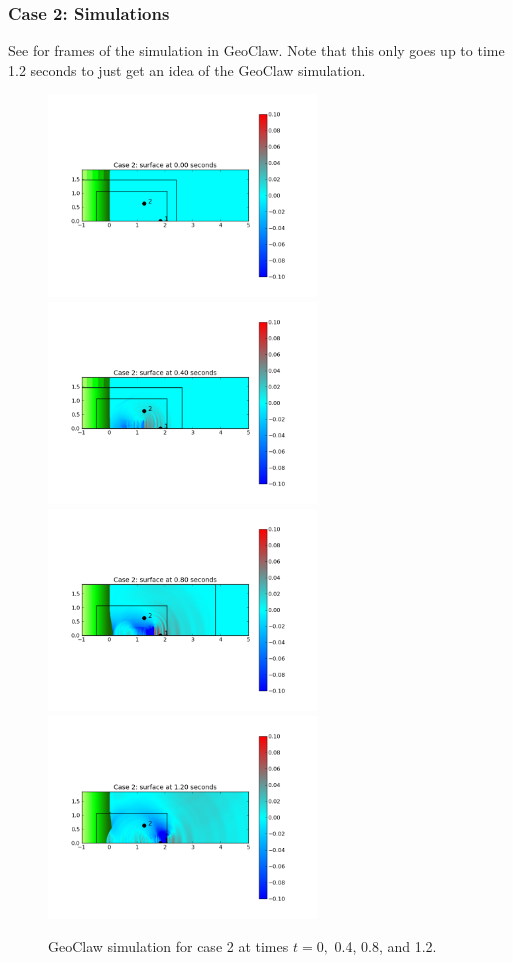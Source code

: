 \subsubsection{Case 2: Simulations}

See  for frames of the simulation in GeoClaw.  Note that
this only goes up to time 1.2 seconds to just get an idea of the GeoClaw
simulation.

\begin{figure}[ht]
\hfil\includegraphics[width=2.8in]{bp12/case2pcolor0.png}\hfil
\hfil\includegraphics[width=2.8in]{bp12/case2pcolor4.png}\hfil
\vskip 5pt
\hfil\includegraphics[width=2.8in]{bp12/case2pcolor8.png}\hfil
\hfil\includegraphics[width=2.8in]{bp12/case2pcolor12.png}\hfil
\caption{\label{fig:bp8pcolorcase2}
GeoClaw simulation for case 2 at times $t = 0,$ 0.4, 0.8, and 1.2.
  }
\end{figure}

